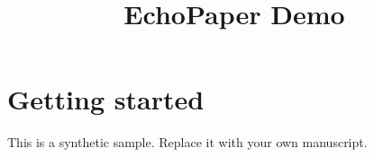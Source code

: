 \documentclass{article}
\title{EchoPaper Demo}
\date{}
\begin{document}
\maketitle
\section{Getting started}
This is a synthetic sample. Replace it with your own manuscript.
\end{document}
